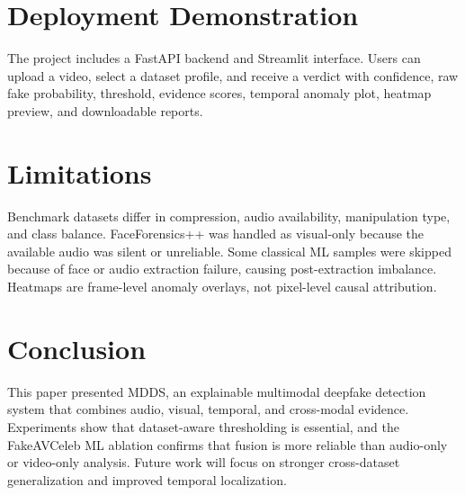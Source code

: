 \documentclass[conference]{IEEEtran}
\begin{document}
\section{Deployment Demonstration}
The project includes a FastAPI backend and Streamlit interface. Users can upload a video, select a dataset profile, and receive a verdict with confidence, raw fake probability, threshold, evidence scores, temporal anomaly plot, heatmap preview, and downloadable reports.

\section{Limitations}
Benchmark datasets differ in compression, audio availability, manipulation type, and class balance. FaceForensics++ was handled as visual-only because the available audio was silent or unreliable. Some classical ML samples were skipped because of face or audio extraction failure, causing post-extraction imbalance. Heatmaps are frame-level anomaly overlays, not pixel-level causal attribution.

\section{Conclusion}
This paper presented MDDS, an explainable multimodal deepfake detection system that combines audio, visual, temporal, and cross-modal evidence. Experiments show that dataset-aware thresholding is essential, and the FakeAVCeleb ML ablation confirms that fusion is more reliable than audio-only or video-only analysis. Future work will focus on stronger cross-dataset generalization and improved temporal localization.



\end{document}

